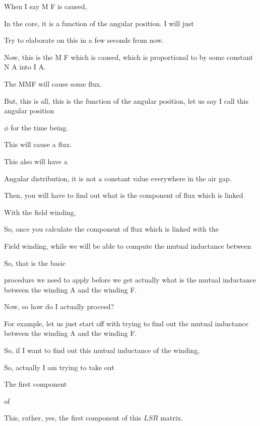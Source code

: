 \documentclass{article}
\begin{document}
When I say M F is caused,

In the core, it is a function of the angular position. I will just

Try to elaborate on this in a few seconds from now.

Now, this is the M F which is caused, which is proportional to by some constant N A into I A.

The MMF will cause some flux.

But, this is all, this is the function of the angular position, let us say I call this angular position

$\phi$ for the time being.

This will cause a flux.

This also will have a

Angular distribution, it is not a constant value everywhere in the air gap.

Then, you will have to find out what is the component of flux which is linked

With the field winding,



So, once you calculate the component of flux which is linked with the

Field winding, while we will be able to compute the mutual inductance between

So, that is the basic

procedure we need to apply before we get actually what is the mutual inductance between the winding A and the winding F.

Now, so how do I actually proceed?

For example, let us just start off with trying to find out the mutual inductance between the winding A and the winding F.

So, if I want to find out this mutual inductance of the winding,

So, actually I am trying to take out

The first component

of

This, rather, yes, the first component of this $LSR$ matrix.
\end{document}
